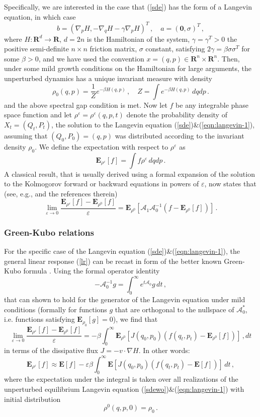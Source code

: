 \documentclass[]{tMPH2e}
\newcommand{\R}{{\mathbf R}}
\newcommand{\eps}{\varepsilon}
\newcommand{\cA}{\mathcal A}
\newcommand{\bE}{{\mathbf E}}
\newcommand{\zero}{{\mathbf 0}}
\newcommand{\wrt}{with respect to }
\begin{document}
Specifically, we are interested in the case that (\ref{sde}) has the form of a Langevin equation, in which case  
\begin{equation}\label{eqn:langevin-1}
b = \left(\nabla_{p}H, -\nabla_{q} H - \gamma\nabla_{p}H\right )^{T}\,,\quad a= (\zero,\sigma)^{T}\,,
\end{equation}
where $H\colon\R^{d}\to\R$, $d=2n$ is the Hamiltonian of the system, $\gamma=\gamma^{T}>0$ the positive semi-definite $n\times n$ friction matrix, $\sigma$ constant, satisfying $2\gamma=\beta\sigma\sigma^{T}$ for some $\beta>0$, and we have used the convention $x=(q,p)\in\R^{n}\times\R^{n}$. Then, under some mild growth conditions on the Hamiltonian for large arguments, the unperturbed dynamics has a unique invariant measure with density 
\[
\rho_{0}(q,p) = \frac{1}{Z}e^{-\beta H(q,p)}\,,\quad  Z=\int  e^{-\beta H(q,p)}\,dqdp\,.
\] 
and the above spectral gap condition is met. Now let $f$ be any integrable phase space function and let $\rho^{\eps}=\rho^{\eps}(q,p,t)$ denote the probability density of $X_t=(Q_{t},P_{t})$, the solution to the Langevin equation (\ref{sde})\&(\ref{eqn:langevin-1}), assuming that $(Q_{0},P_{0})=(q,p)$ was distributed according to the invariant density $\rho_{0}$. We define the expectation \wrt $\rho^{\eps}$ as 
\[
\bE_{\rho^{\eps}}[f] = \int f \rho^{\eps} \,dqdp\,.
\] 
A classical result, that is usually derived using a formal expansion of the solution to the Kolmogorov forward or backward equations in powers of $\eps$, now states that (see, e.g., \cite{hairer2008} and the references therein)
\begin{equation}\label{lr}
\lim_{\eps\to 0}\frac{\bE_{\rho^{\eps}}[f] - \bE_{\rho^{0}}[f]}{\eps} = \bE_{\rho^{0}}[\cA_{1}\cA_{0}^{-1}(f-\bE_{\rho^{0}}[f])]\,.
\end{equation}

\subsubsection*{Green-Kubo relations} 
For the specific case of the Langevin equation (\ref{sde})\&(\ref{eqn:langevin-1}), the general linear response (\ref{lr}) can be recast in form of the better known Green-Kubo formula \cite{marconi2008,risken1996}. Using the formal operator identity 
\[
-\cA_{0}^{-1} g = \int_{0}^{\infty}e^{t\cA_{0}}g \,dt\,,
\]
that can shown to hold for the generator of the Langevin equation under mild conditions (formally for functions $g$ that are orthogonal to the nullspace of $\cA_{0}^{*}$, i.e. functions satisfying $\bE_{\rho_{0}}[g]=0$), we find that 
\begin{equation}\label{GreenKubo}
\lim_{\eps\to 0}\frac{\bE_{\rho^{\eps}}[f] - \bE_{\rho^{0}}[f]}{\eps} = -\beta\int_{0}^{\infty}\bE_{\rho^{0}}[J(q_{0},p_{0}) (f(q_{t},p_{t})-\bE_{\rho^{0}}[f])]\,,dt
\end{equation}
in terms of the dissipative flux $J=-v\cdot\nabla H$. In other words: 
\[
\bE_{\rho^{\eps}}[f] \approx \bE[f] - \eps\beta\int_{0}^{\infty}\bE[J(q_{0},p_{0}) (f(q_{t},p_{t})-\bE[f])]\,dt\,,
\]
 where the expectation under the integral is taken over all realizations of the unperturbed equilibrium Langevin equation (\ref{sdewo})\&(\ref{eqn:langevin-1}) with initial distribution 
 \[
 \rho^{0}(q,p,0)=\rho_{0}\,.
 \]
\end{document}
